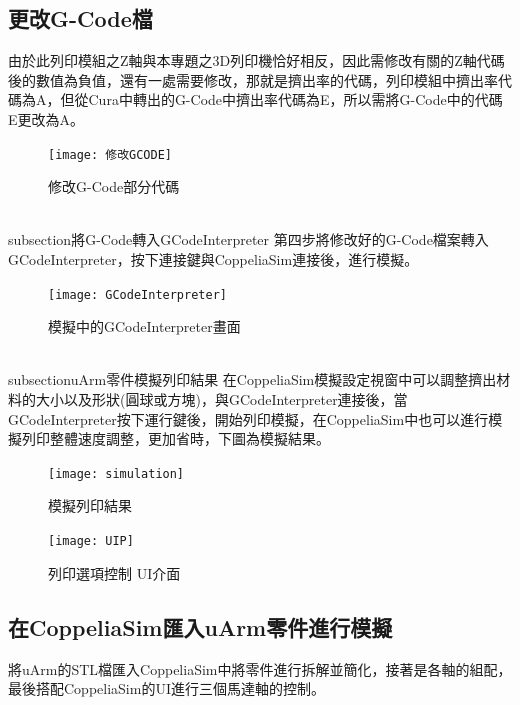 \subsection{更改G-Code檔}
 由於此列印模組之Z軸與本專題之3D列印機恰好相反，因此需修改有關的Z軸代碼後的數值為負值，還有一處需要修改，那就是擠出率的代碼，列印模組中擠出率代碼為A，但從Cura中轉出的G-Code中擠出率代碼為E，所以需將G-Code中的代碼E更改為A。
\begin{figure}[hbt!]
\begin{center}
\texttt{[image: 修改GCODE]}
\caption{\Large 修改G-Code部分代碼}\label{修改GCODE}
\end{center}
\end{figure}
\\subsection{將G-Code轉入GCodeInterpreter}
 第四步將修改好的G-Code檔案轉入GCodeInterpreter，按下連接鍵與CoppeliaSim連接後，進行模擬。\\
\begin{figure}[hbt!]
\begin{center}
\texttt{[image: GCodeInterpreter]}
\caption{\Large 模擬中的GCodeInterpreter畫面}\label{GCodeInterpreter}
\end{center}
\end{figure}
\\subsection{uArm零件模擬列印結果}
 在CoppeliaSim模擬設定視窗中可以調整擠出材料的大小以及形狀(圓球或方塊)，與GCodeInterpreter連接後，當GCodeInterpreter按下運行鍵後，開始列印模擬，在CoppeliaSim中也可以進行模擬列印整體速度調整，更加省時，下圖為模擬結果。\\
\begin{figure}[hbt!]
\begin{center}
\texttt{[image: simulation]}
\caption{\Large 模擬列印結果}\label{simulation}
\end{center}
\end{figure}

\begin{figure}[hbt!]
\begin{center}
\texttt{[image: UIP]}
\caption{\Large 列印選項控制 UI介面}\label{UIP}
\end{center}
\end{figure}

\subsection{在CoppeliaSim匯入uArm零件進行模擬}
 將uArm的STL檔匯入CoppeliaSim中將零件進行拆解並簡化，接著是各軸的組配，最後搭配CoppeliaSim的UI進行三個馬達軸的控制。\\
 
